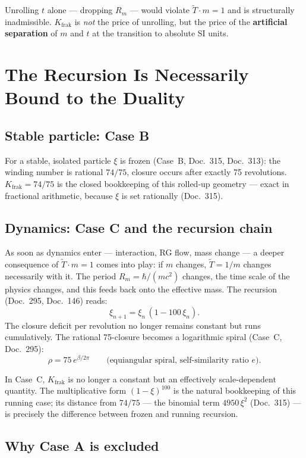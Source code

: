 Unrolling $t$ alone — dropping $R_m$ — would violate
$\tilde{T}\cdot m=1$ and is structurally inadmissible.
$K_{\text{frak}}$ is \emph{not} the price of unrolling, but the price
of the \textbf{artificial separation} of $m$ and $t$ at the transition
to absolute SI units.

\section{The Recursion Is Necessarily Bound to the Duality}

\subsection{Stable particle: Case B}

For a stable, isolated particle $\xi$ is frozen (Case~B, Doc.~315,
Doc.~313): the winding number is rational $74/75$, closure occurs after
exactly 75 revolutions. $K_{\text{frak}}=74/75$ is the closed
bookkeeping of this rolled-up geometry — exact in fractional
arithmetic, because $\xi$ is set rationally (Doc.~315).

\subsection{Dynamics: Case C and the recursion chain}

As soon as dynamics enter — interaction, RG flow, mass change — a
deeper consequence of $\tilde{T}\cdot m=1$ comes into play: if $m$
changes, $\tilde{T}=1/m$ changes necessarily with it. The period
$R_m=\hbar/(mc^2)$ changes, the time scale of the physics changes,
and this feeds back onto the effective mass. The recursion
(Doc.~295, Doc.~146) reads:
\[
  \xi_{n+1} = \xi_n\,(1-100\,\xi_n).
\]
The closure deficit per revolution no longer remains constant but runs
cumulatively. The rational 75-closure becomes a logarithmic spiral
(Case~C, Doc.~295):
\[
  \rho = 75\,e^{\beta/2\pi}
  \qquad\text{(equiangular spiral, self-similarity ratio }e\text{)}.
\]

In Case~C, $K_{\text{frak}}$ is no longer a constant but an
effectively scale-dependent quantity. The multiplicative form
$(1-\xi)^{100}$ is the natural bookkeeping of this running case; its
distance from $74/75$ — the binomial term $4950\,\xi^2$ (Doc.~315) —
is precisely the difference between frozen and running recursion.

\subsection{Why Case A is excluded}

